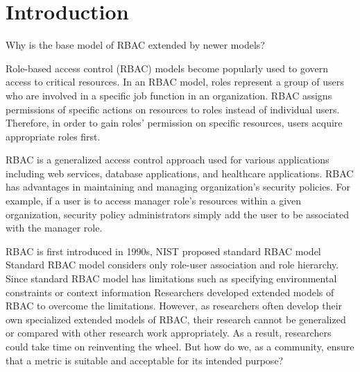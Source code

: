 \section{Introduction} \label{sec:introduction}

Why is the base model of RBAC extended by newer models?

Role-based access control (RBAC) models \cite{ferraiolo} become popularly used to govern access to critical resources.  In an RBAC model, roles represent a group of users who are involved in a specific job function in an organization. RBAC assigns permissions of specific actions on resources to roles instead of individual users.  Therefore, in order to gain roles' permission on specific resources, users acquire appropriate roles first.

RBAC is a generalized access control approach used for various applications including web services, database applications, and healthcare applications.  RBAC has advantages in maintaining and managing organization's security policies.  For example, if a user is to access manager role's resources within a given organization, security policy administrators simply add the user to be associated with the manager role.

RBAC is first introduced in 1990s, NIST proposed standard RBAC model \cite{ferraiolo}
Standard RBAC model considers only role-user association and role hierarchy.
Since standard RBAC model has limitations such as specifying environmental constraints or context information
Researchers developed extended models of RBAC to overcome the limitations.
However, as researchers often develop their own specialized extended models of RBAC,
their research cannot be generalized or compared with other research work appropriately.
As a result, researchers could take time on reinventing the wheel.
But how do we, as a community, ensure that a metric is suitable and acceptable for its intended purpose?

